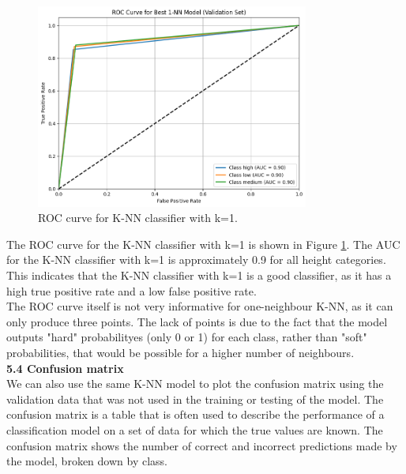 \documentclass[12pt]{article}
\begin{document}
\begin{figure}[h!]
\centering
\includegraphics[width=0.8\textwidth]{figures/knn_roc_curve.png}
\caption{ROC curve for K-NN classifier with k=1.}
\label{fig:knn_roc_curve}
\end{figure}

The ROC curve for the K-NN classifier with k=1 is shown in Figure \ref{fig:knn_roc_curve}. The AUC for the K-NN classifier with k=1 is approximately 0.9 for all height categories. This indicates that the K-NN classifier with k=1 is a good classifier, as it has a high true positive rate and a low false positive rate. 
\\
The ROC curve itself is not very informative for one-neighbour K-NN, as it can only produce three points. The lack of points is due to the fact that the model outputs "hard" probabilityes (only 0 or 1) for each class, rather than "soft" probabilities, that would be possible for a higher number of neighbours. 
\\

\textbf{5.4 Confusion matrix}
\\
We can also use the same K-NN model to plot the confusion matrix using the validation data that was not used in the training or testing of the model. The confusion matrix is a table that is often used to describe the performance of a classification model on a set of data for which the true values are known. The confusion matrix shows the number of correct and incorrect predictions made by the model, broken down by class.
\end{document}
